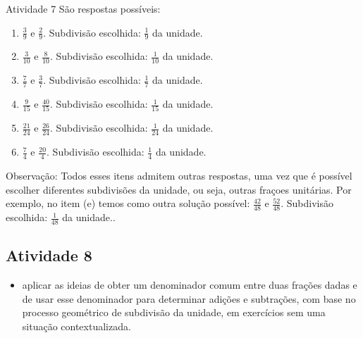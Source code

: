 \begin{multicols}{2}
\begin{resposta*}{Atividade 7}
  São respostas possíveis:
\begin{enumerate} [\quad a)] %
    \item             $\frac{3}{9}$       e       $\frac{2}{9}$.        Subdivisão escolhida:       $\frac{1}{9}$       da unidade.
    \item             $\frac{3}{10}$       e       $\frac{8}{10}$.      Subdivisão escolhida:       $\frac{1}{10}$       da unidade.
    \item             $\frac{7}{7}$       e       $\frac{3}{7}$.        Subdivisão escolhida:       $\frac{1}{7}$       da unidade.
    \item             $\frac{9}{15}$       e       $\frac{40}{15}$.   Subdivisão escolhida:       $\frac{1}{15}$       da unidade.
    \item             $\frac{21}{24}$       e       $\frac{26}{24}$.    Subdivisão escolhida:       $\frac{1}{24}$       da unidade.
    \item             $\frac{7}{4}$       e       $\frac{20}{4}$.       Subdivisão escolhida:       $\frac{1}{4}$       da unidade.
\end{enumerate} %


  Observação: Todos esses itens admitem outras respostas, uma vez que é possível escolher diferentes subdivisões da unidade, ou seja, outras fraçoes unitárias. Por exemplo, no item (e) temos como outra solução possível:   $\frac{42}{48}$   e   $\frac{52}{48}$. Subdivisão escolhida:   $\frac{1}{48}$   da unidade..
\end{resposta*}



\subsection{Atividade 8}

  \newline \vspace{.15cm}

  \begin{itemize} %
    \item       aplicar as ideias de obter um denominador comum entre duas frações dadas e de usar esse denominador para determinar adições e subtrações, com base no processo geométrico de subdivisão da unidade, em exercícios sem uma situação contextualizada.
  \end{itemize} %



\end{multicols}

